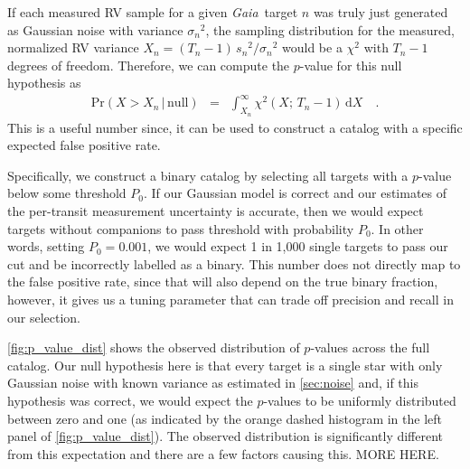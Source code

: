 \documentclass[modern, letterpaper]{aastex631}
\newcommand{\project}[1]{\textsl{#1}}
\newcommand{\Gaia}{\project{Gaia}}
\newcommand{\dd}{\ensuremath{\,\mathrm{d}}}
\begin{document}
If each measured RV sample for a given \Gaia\ target $n$ was truly just generated as Gaussian noise with variance ${\sigma_n}^2$, the sampling distribution for the measured, normalized RV variance $X_n = (T_n - 1)\,{s_n}^2 / {\sigma_n}^2$ would be a $\chi^2$ with $T_n - 1$ degrees of freedom.
Therefore, we can compute the $p$-value for this null hypothesis as
\begin{eqnarray}
	\mathrm{Pr}(X > X_n\,|\,\mathrm{null}) &=& \int_{X_n}^\infty \chi^2 (X;\,T_n-1) \dd X \quad.
\end{eqnarray}
This is a useful number since, it can be used to construct a catalog with a specific expected false positive rate.

Specifically, we construct a binary catalog by selecting all targets with a $p$-value below some threshold $P_0$.
If our Gaussian model is correct and our estimates of the per-transit measurement uncertainty is accurate, then we would expect targets without companions to pass threshold with probability $P_0$.
In other words, setting $P_0 = 0.001$, we would expect 1 in 1,000 single targets to pass our cut and be incorrectly labelled as a binary.
This number does not directly map to the false positive rate, since that will also depend on the true binary fraction, however, it gives us a tuning parameter that can trade off precision and recall in our selection.

\autoref{fig:p_value_dist} shows the observed distribution of $p$-values across the full catalog.
Our null hypothesis here is that every target is a single star with only Gaussian noise with known variance as estimated in \autoref{sec:noise} and, if this hypothesis was correct, we would expect the $p$-values to be uniformly distributed between zero and one (as indicated by the orange dashed histogram in the left panel of \autoref{fig:p_value_dist}).
The observed distribution is significantly different from this expectation and there are a few factors causing this.
MORE HERE.

\end{document}
